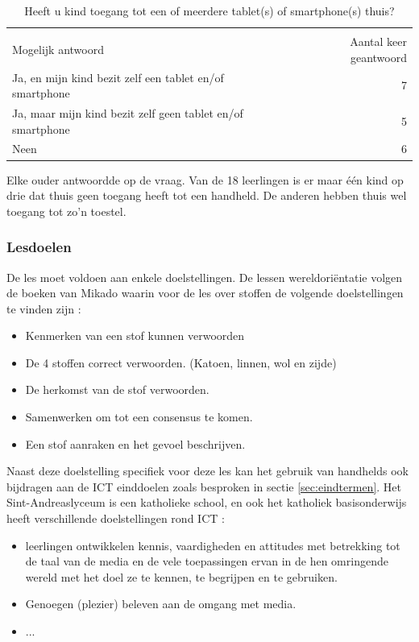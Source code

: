 \documentclass[pdftex,a4paper,12pt,twoside]{report}
\begin{document}
\begin{table}[h]
\caption{Heeft u kind toegang tot een of meerdere tablet(s) of smartphone(s) thuis?}
\label{table:vraag}
\begin{tabular}{l r}

  &  \\
Mogelijk antwoord & Aantal keer geantwoord\\
\hline
Ja, en mijn kind bezit zelf een tablet en/of smartphone & 7 \\
Ja, maar mijn kind bezit zelf geen tablet en/of smartphone & 5 \\
Neen & 6 \\

\end{tabular}
\end{table}

Elke ouder antwoordde op de vraag. Van de 18 leerlingen is er maar \'e\'en kind op drie dat thuis geen toegang heeft tot een handheld. De anderen hebben thuis wel toegang tot zo'n toestel. \\

\subsubsection{Lesdoelen}
De les moet voldoen aan enkele doelstellingen. De lessen wereldori\"entatie volgen de boeken van Mikado waarin voor de les over stoffen de volgende doelstellingen te vinden zijn \citep{mikado}:
\begin{itemize}
\item Kenmerken van een stof kunnen verwoorden
\item De 4 stoffen correct verwoorden. (Katoen, linnen, wol en zijde)
\item De herkomst van de stof verwoorden. 
\item Samenwerken om tot een consensus te komen.
\item Een stof aanraken en het gevoel beschrijven.
\end{itemize}

Naast deze doelstelling specifiek voor deze les kan het gebruik van handhelds ook bijdragen aan de ICT einddoelen zoals besproken in sectie \ref{sec:eindtermen}. Het Sint-Andreaslyceum is een katholieke school, en ook het katholiek basisonderwijs heeft verschillende doelstellingen rond ICT \citep{katholiek}:
\begin{itemize}
\item leerlingen ontwikkelen kennis, vaardigheden en attitudes met betrekking tot de taal van de media en de vele	toepassingen ervan in de hen omringende wereld met het doel ze te kennen, te begrijpen en te gebruiken.
\item Genoegen (plezier) beleven aan de omgang met media.
\item ...
\end{itemize}
\end{document}
